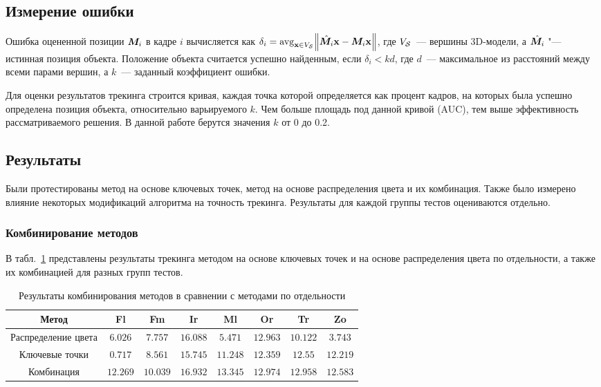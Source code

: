 \subsection{Измерение ошибки}

Ошибка оцененной позиции $\bm{M}_i$ в кадре $i$ вычисляется как
$
\delta_i = \operatorname*{avg}_{\mathbf{x} \in V_{\mathcal{S}}} \norm{\hat{\bm{M}_i} \mathbf{x} - \bm{M}_i
\mathbf{x}}
$,
где $V_{\mathcal{S}}$~--- вершины 3D-модели,
а $\hat{\bm{M}_i}$ "--- истинная позиция объекта.
Положение объекта считается успешно найденным, если $\delta_i < k d$, где
$d$~--- максимальное из расстояний между всеми парами вершин, а $k$~---
заданный коэффициент ошибки.

Для оценки результатов трекинга строится кривая, каждая точка которой
определяется как процент кадров, на которых была успешно определена позиция
объекта, относительно варьируемого $k$.
Чем больше площадь под данной кривой (AUC), тем выше эффективность
рассматриваемого решения.
В данной работе берутся значения $k$ от 0 до 0.2.

\subsection{Результаты}
Были протестированы метод на основе ключевых точек, метод на основе
распределения цвета и их комбинация.
Также было измерено влияние некоторых модификаций алгоритма на
точность трекинга.
Результаты для каждой группы тестов оцениваются отдельно.

\subsubsection{Комбинирование методов}

В табл.~\ref{tab:combine} представлены результаты трекинга методом на основе
ключевых точек и на основе распределения цвета по отдельности, а также их
комбинацией для разных групп тестов.

\begin{table}[h]
\caption{\label{tab:combine}Результаты комбинирования методов в сравнении с
методами по отдельности}
\begin{center}
\begin{tabular}{|c|c|c|c|c|c|c|c|}
\hline
Метод & Fl & Fm & Ir & Ml & Or & Tr & Zo \\
\hline
Распределение цвета & $6.026$ & $7.757$ & $16.088$ & $5.471$ & $12.963$ &
$10.122$ & $3.743$ \\
\hline
Ключевые точки & $0.717$ & $8.561$ & $15.745$ & $11.248$ & $12.359$ & $12.55$ &$12.219$ \\
\hline
Комбинация & $12.269$ & $10.039$ & $16.932$ & $13.345$ & $12.974$ & $12.958$ &
$12.583$ \\
\hline
\end{tabular}
\end{center}
\end{table}

